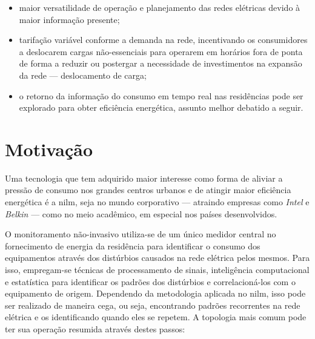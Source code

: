 \begin{itemize}
\item maior versatilidade de operação e planejamento das redes
elétricas devido à maior informação presente; 
\item tarifação variável conforme a demanda na rede, incentivando os
consumidores a deslocarem cargas não-essenciais para operarem em
horários fora de ponta de forma a reduzir ou postergar a necessidade
de investimentos na expansão da rede --- deslocamento de carga;
\item o retorno da informação do consumo em tempo real nas residências pode ser
explorado para obter eficiência energética, assunto melhor
debatido a seguir.
\end{itemize}

\section{Motivação}

Uma tecnologia que tem adquirido maior interesse como forma de aliviar
a pressão de consumo nos grandes centros urbanos e de atingir maior
eficiência energética é a \gls{nilm}, seja no mundo corporativo --- atraindo
empresas como \emph{Intel} e \emph{Belkin} --- como no meio acadêmico,
em especial nos países desenvolvidos.

O monitoramento não-invasivo utiliza-se de um único medidor central no
fornecimento de energia da residência para identificar o consumo dos
equipamentos através dos distúrbios causados na rede elétrica pelos
mesmos. Para isso, empregam-se técnicas de processamento
de sinais, inteligência computacional e estatística para identificar
os padrões dos distúrbios e correlacioná-los com o equipamento de origem.
Dependendo da metodologia aplicada no \acs{nilm}, isso pode ser
realizado de maneira cega, ou seja, encontrando padrões recorrentes
na rede elétrica e os identificando quando eles se repetem.
A topologia mais comum pode ter sua operação resumida através destes
passos:

